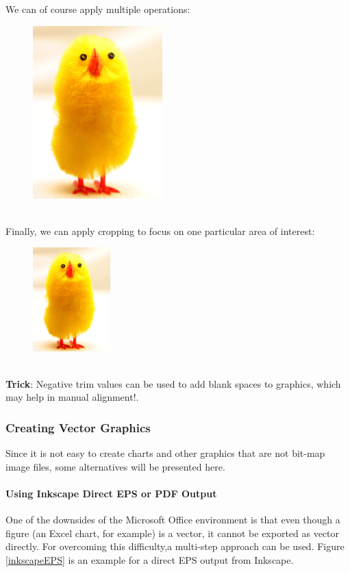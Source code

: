 \documentclass[10pt, a4paper]{article}
\begin{document}
We can of course apply multiple operations:
\begin{figure}[htbp]
\centering
\includegraphics[angle=135, scale=0.7]{images/chick1}
\end{figure}
\\ Finally, we can apply cropping to focus on one particular area of interest:
\begin{figure}[htbp]
\centering
\includegraphics[trim = 10mm 40mm 10mm 5mm, clip, width=3cm ]{images/chick1}
\end{figure}
\\ \textbf{Trick}: Negative trim values can be used to add blank spaces to graphics, which may help in manual alignment!.
\subsubsection{Creating Vector Graphics}
Since it is not easy to create charts and other graphics that are not bit-map image files, some alternatives will be presented here.

\paragraph{Using Inkscape Direct EPS or PDF Output} One of the downsides of the Microsoft Office environment is that even though a figure (an Excel chart, for example) is a vector, it cannot be exported as vector directly. For overcoming this difficulty,a multi-step approach can be used. Figure \ref{inkscapeEPS} is an example for a direct EPS output from Inkscape.
\end{document}
